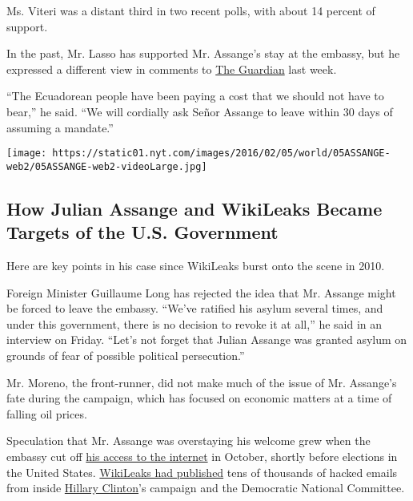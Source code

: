 Ms. Viteri was a distant third in two recent polls, with about 14
percent of support.

In the past, Mr. Lasso has supported Mr. Assange's stay at the embassy,
but he expressed a different view in comments to
\href{https://www.theguardian.com/world/2017/feb/09/ecuador-julian-assange-embassy-notice-eviction}{The
Guardian} last week.

``The Ecuadorean people have been paying a cost that we should not have
to bear,'' he said. ``We will cordially ask Señor Assange to leave
within 30 days of assuming a mandate.''

\href{https://www.nytimes.com/interactive/2019/world/julian-assange-wikileaks.html}{}

\texttt{[image: https://static01.nyt.com/images/2016/02/05/world/05ASSANGE-web2/05ASSANGE-web2-videoLarge.jpg]}

\hypertarget{how-julian-assange-and-wikileaks-became-targets-of-the-us-government}{%
\subsection{How Julian Assange and WikiLeaks Became Targets of the U.S.
Government}\label{how-julian-assange-and-wikileaks-became-targets-of-the-us-government}}

Here are key points in his case since WikiLeaks burst onto the scene in
2010.

Foreign Minister Guillaume Long has rejected the idea that Mr. Assange
might be forced to leave the embassy. ``We've ratified his asylum
several times, and under this government, there is no decision to revoke
it at all,'' he said in an interview on Friday. ``Let's not forget that
Julian Assange was granted asylum on grounds of fear of possible
political persecution.''

Mr. Moreno, the front-runner, did not make much of the issue of Mr.
Assange's fate during the campaign, which has focused on economic
matters at a time of falling oil prices.

Speculation that Mr. Assange was overstaying his welcome grew when the
embassy cut off
\href{https://www.nytimes.com/2016/10/19/world/europe/julian-assange-embassy.html}{his
access to the internet} in October, shortly before elections in the
United States.
\href{https://www.nytimes.com/2016/11/09/us/politics/julian-assange-wikileaks-emails.html}{WikiLeaks
had published} tens of thousands of hacked emails from inside
\href{http://www.nytimes.com/topic/person/hillary-rodham-clinton?inline=nyt-per}{Hillary
Clinton}'s campaign and the Democratic National Committee.


